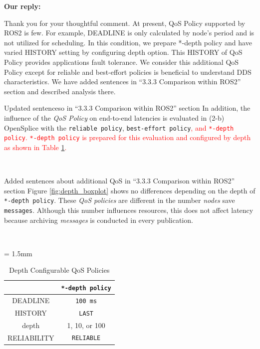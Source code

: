 \documentclass{article}
\begin{document}
\begin{enumerate}
  \begin{flushleft}
    \textbf{Our reply:}
  \end{flushleft}
  Thank you for your thoughtful comment.
  At present, QoS Policy supported by ROS2 is few.
  For example, DEADLINE is only calculated by node's period and is not utilized for scheduling.
  In this condition, we prepare *-depth policy and have varied HISTORY setting by configuring depth option.
  This HISTORY of QoS Policy provides applications fault tolerance.
  We consider this additional QoS Policy except for reliable and best-effort policies is beneficial to understand DDS characteristics.
  We have added sentences in ``3.3.3 Comparison within ROS2'' section and described analysis there.
  \begin{itembox}[|]{Updated sentenceso in ``3.3.3 Comparison within ROS2'' section}
    In addition, the influence of the \emph{QoS Policy} on end-to-end latencies is evaluated in (2-b) OpenSplice with the \texttt{reliable policy}, \texttt{best-effort policy}\textcolor{red}{, and \texttt{*-depth policy}.
    \texttt{*-depth policy} is prepared for this evaluation and configured by depth as shown in Table \ref{tb:depth_qos}.}
  \end{itembox}\\
  \begin{itembox}[|]{Added sentences about additional QoS in ``3.3.3 Comparison within ROS2'' section}
    Figure \ref{fig:depth_boxplot} shows no differences depending on the depth of \texttt{*-depth policy}.
    These \emph{QoS policies} are different in the number \emph{nodes} save \texttt{messages}.
    Although this number influences resources, this does not affect latency because archiving \emph{messages} is conducted in every publication.
  \end{itembox}\\
  \renewcommand{\arraystretch}{1.0}
  \setcounter{table}{4}
  \begin{table}[H]
    \caption{\label{tb:depth_qos}Depth Configurable QoS Policies}
    \centering
    \tabcolsep = 1.5mm              %
    \begin{tabular}{c|c}
      \hline
      & \textbf{\texttt{*-depth policy} }\\
      \hline
      \hline
      DEADLINE & \texttt{100 ms}\\
      HISTORY & \texttt{LAST}\\
      depth & 1, 10, or 100\\
      RELIABILITY & \texttt{RELIABLE}\\

\end{tabular}
\end{table}
\end{enumerate}
\end{document}

